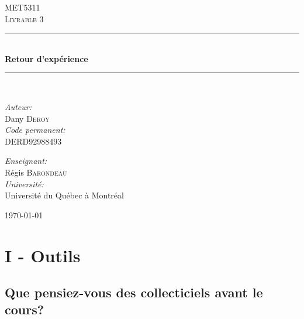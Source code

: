 \documentclass[12pt]{article}
\newcommand{\HRule}{\rule{\linewidth}{0.5mm}}
\begin{document}
\begin{titlepage}
\begin{center}
\textsc{\LARGE MET5311}\\[1.5cm]
\textsc{\Large Livrable 3}\\[0.5cm]
\HRule \\[0.4cm]
{ \huge \bfseries Retour d'expérience \\[0.4cm] }
\HRule \\[1.5cm]
\noindent
\begin{minipage}[t]{0.4\textwidth}
\begin{flushleft} \large
\emph{Auteur:}\\
Dany \textsc{Deroy}\\
\emph{Code permanent:}\\
DERD92988493
\end{flushleft}
\end{minipage}
\begin{minipage}[t]{0.4\textwidth}
\begin{flushright} \large
\emph{Enseignant:} \\
Régis \textsc{Barondeau}\\
\emph{Université:} \\
Université du Québec à Montréal
\end{flushright}
\end{minipage}
\vfill
{\large \today}
\end{center}
\end{titlepage}
\newpage

\tableofcontents
\newpage
\justify

\begin{comment}
Chaque étudiante, étudiant rédigera son retour d'expérience sur l'ensemble du cours en 3000 mots +ou- 		5%
\end{comment}

\section{I - Outils}
\hrulefill

\subsection{Que pensiez-vous des collecticiels avant le cours?}
\end{document}
